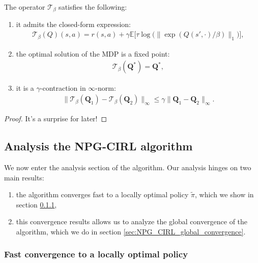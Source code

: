 \begin{lemma}
    \label{lemma:properties_of_soft_bellman}
    The operator $\mathcal{T}_\beta$ satisfies the following:
    \begin{enumerate}
        \item it admits the closed-form expression:
        \begin{align*}
            \mathcal{T}_\beta (Q)(s,a)
            = r(s,a) 
            + \gamma \mathbb{E} \Big[
                \tau \log \bigl( \| \exp(Q(s',\cdot)/\beta) \|_1 \bigr)
                \Big],
        \end{align*} 
        \item the optimal solution of the MDP is a fixed point:
        \begin{align*}
            \mathcal{T}_\beta (\bm{Q}^*)
            = \bm{Q}^*,
        \end{align*} 
        \item it is a $\gamma$-contraction in $\infty$-norm:
        \begin{align*}
            \| \mathcal{T}_\beta (\bm{Q}_1) - \mathcal{T}_\beta (\bm{Q}_2) \|_\infty
            \leq \gamma \| \bm{Q}_1 - \bm{Q}_2 \|_\infty.
        \end{align*} 
    \end{enumerate}
\end{lemma}


\begin{proof}
    It's a surprise for later!
\end{proof}


\subsection{Analysis the NPG-CIRL algorithm}

We now enter the analysis section of the algorithm. Our analysis hinges on two main results:
\begin{enumerate}
    \item the algorithm converges fast to a locally optimal policy $\tilde{\pi}$, which we show in section \ref{sec:NPG_CIRL_fast_conv_local_optimal},
    \item this convergence results allows us to analyze the global convergence of the algorithm, which we do in section  \ref{sec:NPG_CIRL_global_convergence}.
\end{enumerate}

\subsubsection{Fast convergence to a locally optimal policy}
\label{sec:NPG_CIRL_fast_conv_local_optimal}

